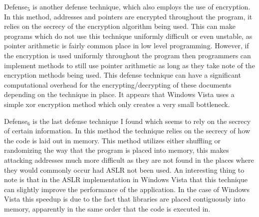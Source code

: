 \documentclass[11pt]{amsart}
\begin{document}
Defense$_5$ is another defense technique, which also employs the use of encryption.  In this method, addresses and pointers are encrypted throughout the program, it relies on the secrecy of the encryption algorithm being used.  This can make programs which do not use this technique uniformly difficult or even unstable, as pointer arithmetic is fairly common place in low level programming.  However, if the encryption is used uniformly throughout the program then programmers can implement methods to still use pointer arithmetic as long as they take note of the encryption methods being used.  This defense technique can have a significant computational overhead for the encrypting/decrypting of these documents depending on the technique in place.  It appears that Windows Vista uses a simple xor encryption method which only creates a very small bottleneck.

Defense$_6$ is the last defense technique I found which seems to rely on the secrecy of certain information.  In this method the technique relies on the secrecy of how the code is laid out in memory.  This method utilizes either shuffling or randomizing the way that the program is placed into memory, this makes attacking addresses much more difficult as they are not found in the places where they would commonly occur had ASLR not been used.  An interesting thing to note is that in the ASLR implementation in Windows Vista that this technique can slightly improve the performance of the application.  In the case of Windows Vista this speedup is due to the fact that libraries are placed contiguously into memory, apparently in the same order that the code is executed in.
\end{document}
